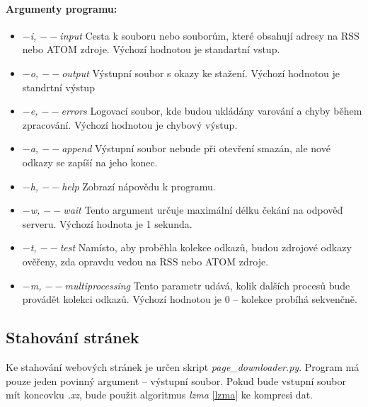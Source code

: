 \paragraph{Argumenty programu: }
\begin{itemize}
    \item \textit{$-$i, $--$input} Cesta k souboru nebo souborům, které obsahují adresy na RSS nebo ATOM zdroje. Výchozí hodnotou je standartní vstup.
    \item \textit{$-$o, $--$output} Výstupní soubor s okazy ke stažení. Výchozí hodnotou je standrtní výstup
    \item \textit{$-$e, $--$errors} Logovací soubor, kde budou ukládány varování a chyby během zpracování. Výchozí hodnotou je chybový výstup.
    \item \textit{$-$a, $--$append} Výstupní soubor nebude při otevření smazán, ale nové odkazy se zapíší na jeho konec.
    \item \textit{$-$h, $--$help} Zobrazí nápovědu k programu.
    \item \textit{$-$w, $--$wait} Tento argument určuje maximální délku čekání na odpověď serveru. Výchozí hodnota je 1 sekunda.
    \item \textit{$-$t, $--$test} Namísto, aby proběhla kolekce odkazů, budou zdrojové odkazy ověřeny, zda opravdu vedou na RSS nebo ATOM zdroje.
    \item \textit{$-$m, $--$multiprocessing} Tento parametr udává, kolik dalších procesů bude provádět kolekci odkazů. Výchozí hodnotou je 0 -- kolekce probíhá sekvenčně.
\end{itemize}

\subsection{Stahování stránek}
Ke stahování webových stránek je určen skript \textit{page\_downloader.py}. Program má
pouze jeden povinný argument -- výstupní soubor. Pokud bude vstupní soubor mít koncovku
\textit{.xz}, bude použit algoritmus \textit{lzma} \ref{lzma} ke kompresi dat.


